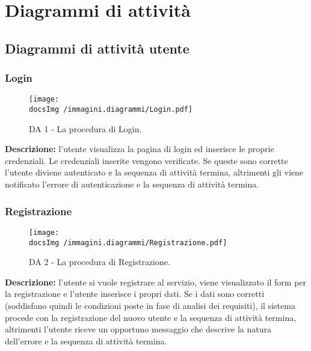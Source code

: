 \section{Diagrammi di attività}
	\subsection{Diagrammi di attività utente}
		\subsubsection{Login}
		\begin{center}
			\begin{figure}[htbp]
				\centering
				\texttt{[image: \\docsImg /immagini.diagrammi/Login.pdf]}
			\caption{DA 1 - La procedura di Login.}	
			\end{figure}
		\end{center}
		\noindent \textbf{Descrizione: }l'utente visualizza la pagina di login ed inserisce le proprie credenziali. Le credenziali inserite vengono verificate. Se queste sono corrette l'utente diviene autenticato e la sequenza di attività termina, altrimenti gli viene notificato l'errore di autenticazione e la sequenza di attività termina.
		\newpage
		
		
		
		\subsubsection{Registrazione}
		\begin{center}
			\begin{figure}[htbp]
				\centering
				\texttt{[image: \\docsImg /immagini.diagrammi/Registrazione.pdf]}
			\caption{DA 2 - La procedura di Registrazione.}	
			\end{figure}
		\end{center}
		\noindent \textbf{Descrizione: }l'utente si vuole registrare al servizio, viene visualizzato il form per la registrazione e l'utente inserisce i propri dati. Se i dati sono corretti (soddisfano quindi le condizioni poste in fase di analisi dei requisiti), il sistema procede con la registrazione del nuovo utente e la sequenza di attività termina, altrimenti l'utente riceve un opportuno messaggio che descrive la natura dell'errore e la sequenza di attività termina.
		\newpage
		
		
		
